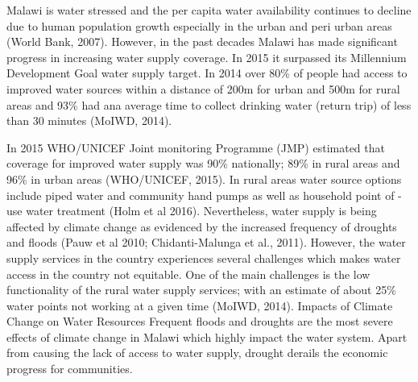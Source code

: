 \documentclass[
]{book}
\begin{document}
Malawi is water stressed and the per capita water availability continues to decline due to human population growth especially in the urban and peri urban areas (World Bank, 2007). However, in the past decades Malawi has made significant progress in increasing water supply coverage. In 2015 it surpassed its Millennium Development Goal water supply target. In 2014 over 80\% of people had access to improved water sources within a distance of 200m for urban and 500m for rural areas and 93\% had ana average time to collect drinking water (return trip) of less than 30 minutes (MoIWD, 2014).

In 2015 WHO/UNICEF Joint monitoring Programme (JMP) estimated that coverage for improved water supply was 90\% nationally; 89\% in rural areas and 96\% in urban areas (WHO/UNICEF, 2015). In rural areas water source options include piped water and community hand pumps as well as household point of -use water treatment (Holm et al 2016). Nevertheless, water supply is being affected by climate change as evidenced by the increased frequency of droughts and floods (Pauw et al 2010; Chidanti-Malunga et al., 2011). However, the water supply services in the country experiences several challenges which makes water access in the country not equitable. One of the main challenges is the low functionality of the rural water supply services; with an estimate of about 25\% water points not working at a given time (MoIWD, 2014).
Impacts of Climate Change on Water Resources
Frequent floods and droughts are the most severe effects of climate change in Malawi which highly impact the water system. Apart from causing the lack of access to water supply, drought derails the economic progress for communities.

\providecommand{\docline}[3]{\noalign{\global\setlength{\arrayrulewidth}{#1}}\arrayrulecolor[HTML]{#2}\cline{#3}}

\setlength{\tabcolsep}{2pt}

\renewcommand*{\arraystretch}{1.5}
\end{document}
